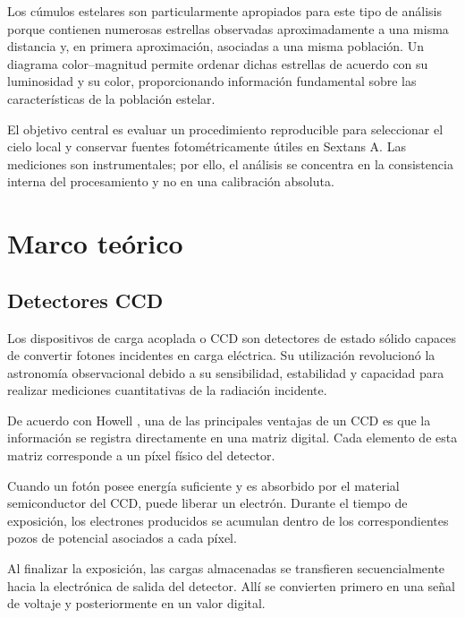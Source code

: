 \documentclass[12pt,letterpaper,oneside]{book}
\begin{document}
Los cúmulos estelares son particularmente apropiados para este tipo de análisis porque contienen numerosas estrellas observadas aproximadamente a una misma distancia y, en primera aproximación, asociadas a una misma población. Un diagrama color--magnitud permite ordenar dichas estrellas de acuerdo con su luminosidad y su color, proporcionando información fundamental sobre las características de la población estelar.

El objetivo central es evaluar un procedimiento reproducible para seleccionar el cielo local y conservar fuentes fotométricamente útiles en Sextans A. Las mediciones son instrumentales; por ello, el análisis se concentra en la consistencia interna del procesamiento y no en una calibración absoluta.



\section{Marco teórico}



\subsection{Detectores CCD}

Los dispositivos de carga acoplada o CCD son detectores de estado sólido capaces de convertir fotones incidentes en carga eléctrica. Su utilización revolucionó la astronomía observacional debido a su sensibilidad, estabilidad y capacidad para realizar mediciones cuantitativas de la radiación incidente.

De acuerdo con Howell \cite{howell2006}, una de las principales ventajas de un CCD es que la información se registra directamente en una matriz digital. Cada elemento de esta matriz corresponde a un píxel físico del detector.

Cuando un fotón posee energía suficiente y es absorbido por el material semiconductor del CCD, puede liberar un electrón. Durante el tiempo de exposición, los electrones producidos se acumulan dentro de los correspondientes pozos de potencial asociados a cada píxel.

Al finalizar la exposición, las cargas almacenadas se transfieren secuencialmente hacia la electrónica de salida del detector. Allí se convierten primero en una señal de voltaje y posteriormente en un valor digital.
\end{document}
